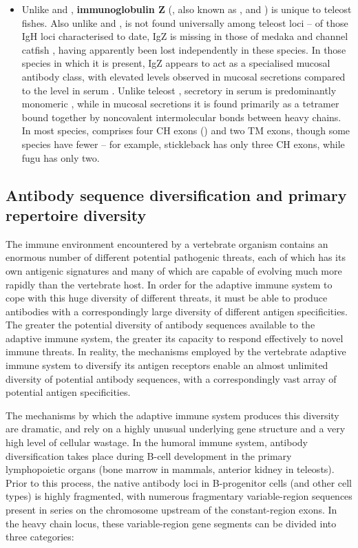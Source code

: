 \begin{itemize}
\item Unlike  and , \textbf{immunoglobulin Z} (, also known as ,  and ) is unique to teleost fishes. Also unlike  and ,  is not found universally among teleost loci -- of those IgH loci characterised to date, IgZ is missing in those of medaka %
and channel catfish %
\citep{fillatreau2013astonishing} , having apparently been lost independently in these species. In those species in which it is present, IgZ appears to act as a specialised mucosal antibody class, with elevated levels observed in mucosal secretions compared to the level in serum \citep{fillatreau2013astonishing} %
. Unlike teleost , secretory  in serum is predominantly monomeric %
, while in mucosal secretions it is found primarily as a tetramer bound together by noncovalent intermolecular bonds between heavy chains.
In most species,  comprises four CH exons () and two TM exons, though some species have fewer -- for example, stickleback  has only three CH exons, while fugu  has only two.
\end{itemize}

\subsection{Antibody sequence diversification and primary repertoire diversity}
\label{sec:intro_immunity_primary}

The immune environment encountered by a vertebrate organism contains an enormous number of different potential pathogenic threats, each of which has its own antigenic signatures and many of which are capable of evolving much more rapidly than the vertebrate host. In order for the adaptive immune system to cope with this huge diversity of different threats, it must be able to produce antibodies with a correspondingly large diversity of different antigen specificities. The greater the potential diversity of antibody sequences available to the adaptive immune system, the greater its capacity to respond effectively to novel immune threats. In reality, the mechanisms employed by the vertebrate adaptive immune system to diversify its antigen receptors enable an almost unlimited diversity of potential antibody sequences, with a correspondingly vast array of potential antigen specificities.

The mechanisms by which the adaptive immune system produces this diversity are dramatic, and rely on a highly unusual underlying gene structure and a very high level of cellular wastage. In the humoral immune system, antibody diversification takes place during B-cell development in the primary lymphopoietic organs (bone marrow in mammals, anterior kidney in teleosts). Prior to this process, the native antibody loci in B-progenitor cells (and other cell types) is highly fragmented, with numerous fragmentary variable-region sequences present in series on the chromosome upstream of the constant-region exons. In the heavy chain locus, these variable-region gene segments can be divided into three categories:

